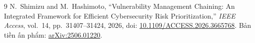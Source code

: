 \documentclass[12pt,a4paper]{article}
\begin{document}
\begin{thebibliography}{9}
N.~Shimizu and M.~Hashimoto, ``Vulnerability Management Chaining: An Integrated Framework for Efficient
Cybersecurity Risk Prioritization,'' \emph{IEEE Access}, vol.~14, pp.~31407--31424, 2026,
doi: \href{https://doi.org/10.1109/ACCESS.2026.3665768}{10.1109/ACCESS.2026.3665768}.
Bản tiền ấn phẩm: \href{https://arxiv.org/abs/2506.01220}{arXiv:2506.01220}.
\end{thebibliography}
\end{document}
